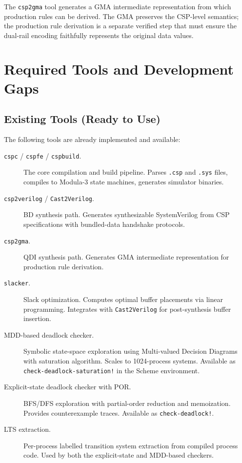 \documentclass[11pt]{article}
\begin{document}
The \texttt{csp2gma} tool generates a GMA intermediate
representation from which production rules can be derived.  The GMA
preserves the CSP-level semantics; the production rule derivation is a
separate verified step that must ensure the dual-rail encoding
faithfully represents the original data values.

\section{Required Tools and Development Gaps}
\label{sec:tools}

\subsection{Existing Tools (Ready to Use)}
\label{sec:existing}

The following tools are already implemented and available:

\begin{description}
\item[\texttt{cspc} / \texttt{cspfe} / \texttt{cspbuild}.]
  The core compilation and build pipeline.  Parses \texttt{.csp} and
  \texttt{.sys} files, compiles to Modula-3 state machines, generates
  simulator binaries.

\item[\texttt{csp2verilog} / \texttt{Cast2Verilog}.]
  BD synthesis path.  Generates synthesizable SystemVerilog from CSP
  specifications with bundled-data handshake protocols.

\item[\texttt{csp2gma}.]
  QDI synthesis path.  Generates GMA intermediate representation for
  production rule derivation.

\item[\texttt{slacker}.]
  Slack optimization.  Computes optimal buffer placements via linear
  programming.  Integrates with \texttt{Cast2Verilog} for
  post-synthesis buffer insertion.

\item[MDD-based deadlock checker.]
  Symbolic state-space exploration using Multi-valued Decision Diagrams
  with saturation algorithm.  Scales to 1024-process systems.
  Available as \texttt{check-deadlock-saturation!} in the Scheme
  environment.

\item[Explicit-state deadlock checker with POR.]
  BFS/DFS exploration with partial-order reduction and memoization.
  Provides counterexample traces.  Available as
  \texttt{check-deadlock!}.

\item[LTS extraction.]
  Per-process labelled transition system extraction from compiled
  process code.  Used by both the explicit-state and MDD-based
  checkers.
\end{description}
\end{document}
